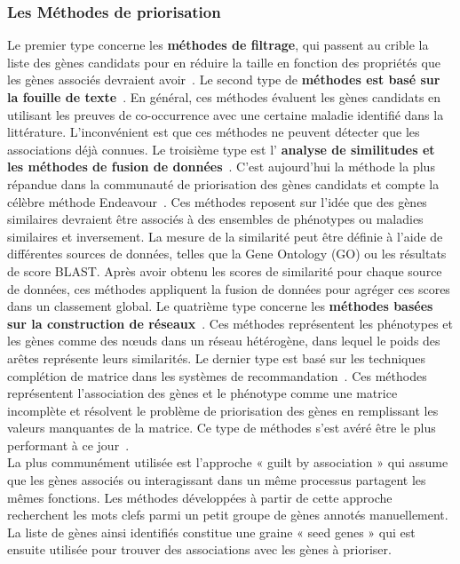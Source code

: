 \subsubsection*{Les Méthodes de priorisation}
Le premier type concerne les \textbf{méthodes de filtrage}, qui passent au crible la liste des gènes candidats pour en réduire la taille en fonction des propriétés que les gènes associés devraient avoir~\cite{biofilter2009,mordelet2011,deo2014}. Le second type de \textbf{méthodes est basé sur la fouille de texte}~\cite{ElShal2016,onto2vec2018,opa2vec2018}. En général, ces méthodes évaluent les gènes candidats en utilisant les preuves de co-occurrence avec une certaine maladie identifié dans la littérature. L'inconvénient est que ces méthodes ne peuvent détecter que les associations déjà connues. Le troisième type est l' \textbf{analyse de similitudes et les méthodes de fusion de données}~\cite{aerts2006,tranchevent2007,chen2009,Li2010,farnoud2014,zitnik2015,zakeri2018,kumar2018}. C'est aujourd'hui la méthode la plus répandue dans la communauté de priorisation des gènes candidats et compte la célèbre méthode Endeavour~\cite{aerts2006}. Ces méthodes reposent sur l’idée que des gènes similaires devraient être associés à des ensembles de phénotypes ou maladies similaires et inversement. La mesure de la similarité peut être définie à l'aide de différentes sources de données, telles que la Gene Ontology (GO) ou les résultats de score BLAST. Après avoir obtenu les scores de similarité pour chaque source de données, ces méthodes appliquent la fusion de données pour agréger ces scores dans un classement global. Le quatrième type concerne les \textbf{méthodes basées sur la construction de réseaux}~\cite{yu2011,lee2011,li2012,Le2012,Le2013,kacprowski2013,singh-blom2013,rao2018}. Ces méthodes représentent les phénotypes et les gènes comme des nœuds dans un réseau hétérogène, dans lequel le poids des arêtes représente leurs similarités. Le dernier type est basé sur les techniques complétion de matrice dans les systèmes de recommandation~\cite{natarajan2014,zakeri2018}. Ces méthodes représentent l'association des gènes et le phénotype comme une matrice incomplète et résolvent le problème de priorisation des gènes en remplissant les valeurs manquantes de la matrice. Ce type de méthodes s'est avéré être le plus performant à ce jour~\cite{zakeri2018}.\\

La plus communément utilisée est l’approche « guilt by association » qui assume que les gènes associés ou interagissant dans un même processus partagent les mêmes fonctions. Les méthodes développées à partir de cette approche recherchent les mots clefs parmi un petit groupe de gènes annotés manuellement. La liste de gènes ainsi identifiés constitue une graine « seed genes » qui est ensuite utilisée pour trouver des associations avec les gènes à prioriser. \\

